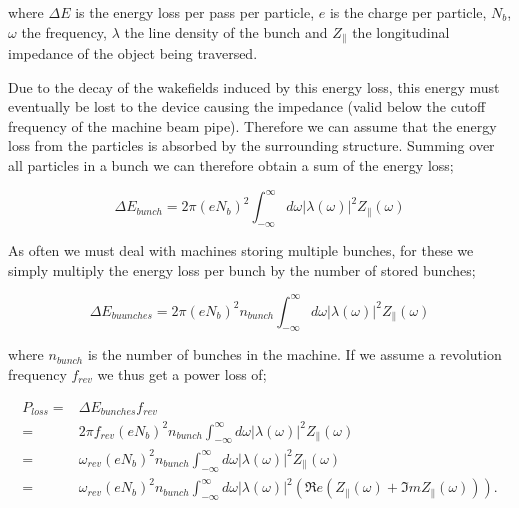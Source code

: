 where $\Delta E$ is the energy loss per pass per particle, $e$ is the charge per particle, $N_{b}$, $\omega$ the frequency, $\lambda$ the line density of the bunch and $Z_{\parallel}$ the longitudinal impedance of the object being traversed.
																
Due to the decay of the wakefields induced by this energy loss, this energy must eventually be lost to the device causing the impedance (valid below the cutoff frequency of the machine beam pipe). Therefore we can assume that the energy loss from the particles is absorbed by the surrounding structure. Summing over all particles in a bunch we can therefore obtain a sum of the energy loss;

\begin{equation}
\Delta E_{bunch} = 2\pi \left( eN_{b}   \right)^{2} \int^{\infty}_{-\infty} d\omega \left| \lambda \left( \omega \right)  \right|^{2} Z_{\parallel} \left( \omega \right)
\end{equation}

As often we must deal with machines storing multiple bunches, for these we simply multiply the energy loss per bunch by the number of stored bunches;

\begin{equation}
\Delta E_{buunches} = 2\pi \left( eN_{b}   \right)^{2}n_{bunch} \int^{\infty}_{-\infty} d\omega \left| \lambda \left( \omega \right)  \right|^{2} Z_{\parallel} \left( \omega \right)
\end{equation}

where $n_{bunch}$ is the number of bunches in the machine. If we assume a revolution frequency $f_{rev}$ we thus get a power loss of;

\begin{align}
P_{loss}  = & \Delta E_{bunches} f_{rev}\nonumber \\  
 = & 2\pi f_{rev} \left( eN_{b}   \right)^{2}n_{bunch} \int^{\infty}_{-\infty} d\omega \left| \lambda \left( \omega \right)  \right|^{2} Z_{\parallel} \left( \omega \right) \nonumber  \\ 
 = & \omega_{rev} \left( eN_{b}   \right)^{2}n_{bunch} \int^{\infty}_{-\infty} d\omega \left| \lambda \left( \omega \right)  \right|^{2} Z_{\parallel} \left( \omega \right) \nonumber \\
 = & \omega_{rev} \left( eN_{b}   \right)^{2}n_{bunch} \int^{\infty}_{-\infty} d\omega \left| \lambda \left( \omega \right)  \right|^{2} \left( \Re{}e \left( Z_{\parallel} \left( \omega\right) + \Im{}m Z_{\parallel} \left( \omega\right) \right) \right).
\end{align}
 
